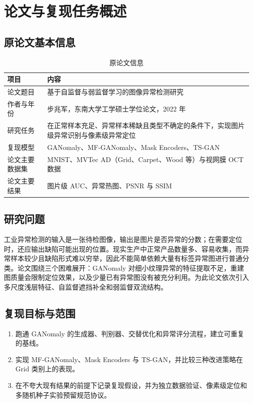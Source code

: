 \documentclass[UTF8,12pt]{ctexart}
\begin{document}
\section{论文与复现任务概述}

\subsection{原论文基本信息}

\begin{table}[H]
\centering
\caption{原论文信息}
\begin{tabularx}{\linewidth}{L{3.2cm}Y}
\toprule
\textbf{项目} & \textbf{内容} \\
\midrule
论文题目 & 基于自监督与弱监督学习的图像异常检测研究 \\
作者与年份 & 步兆军，东南大学工学硕士学位论文，2022 年 \\
研究任务 & 在正常样本充足、异常样本稀缺且类型不确定的条件下，实现图片级异常识别与像素级异常定位 \\
复现模型 & GANomaly、MF-GANomaly、Mask Encoders、TS-GAN \\
论文主要数据集 & MNIST、MVTec AD（Grid、Carpet、Wood 等）与视网膜 OCT 数据 \\
论文主要结果 & 图片级 AUC、异常热图、PSNR 与 SSIM \\
\bottomrule
\end{tabularx}
\end{table}

\subsection{研究问题}

工业异常检测的输入是一张待检图像，输出是图片是否异常的分数；在需要定位时，还应输出缺陷可能出现的位置。现实生产中正常产品数量多、容易收集，而异常样本较少且缺陷形式难以穷举，因此不能简单依赖大量有标签异常图进行普通分类。论文围绕三个困难展开：GANomaly 对细小纹理异常的特征提取不足，重建图质量会限制定位效果，以及少量已有异常图没有被充分利用。为此论文依次引入多尺度浅层特征、自监督遮挡补全和弱监督双流结构。

\subsection{复现目标与范围}

\begin{enumerate}
  \item 跑通 GANomaly 的生成器、判别器、交替优化和异常评分流程，建立可重复的基线。
  \item 实现 MF-GANomaly、Mask Encoders 与 TS-GAN，并比较三种改进策略在 Grid 类别上的表现。
  \item 在不夸大现有结果的前提下记录复现假设，并为独立数据验证、像素级定位和多随机种子实验预留规范协议。
\end{enumerate}
\end{document}
